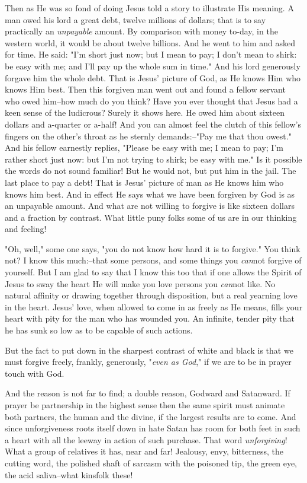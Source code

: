Then as He was so fond of doing Jesus told a story to illustrate His
meaning. A man owed his lord a great debt, twelve millions of dollars;
that is to say practically an \textit{unpayable} amount. By comparison with money
to-day, in the western world, it would be about twelve billions. And he
went to him and asked for time. He said: "I'm short just now; but I mean
to pay; I don't mean to shirk: be easy with me; and I'll pay up the whole
sum in time." And his lord generously forgave him the whole debt. That is
Jesus' picture of God, as He knows Him who knows Him best. Then this
forgiven man went out and found a fellow servant who owed him--how much do
you think? Have you ever thought that Jesus had a keen sense of the
ludicrous? Surely it shows here. He owed him about sixteen dollars and
a-quarter or a-half! And you can almost feel the clutch of this fellow's
fingers on the other's throat as he sternly demands:--"Pay me that thou
owest." And his fellow earnestly replies, "Please be easy with me; I mean
to pay; I'm rather short just now: but I'm not trying to shirk; be easy
with me." Is it possible the words do not sound familiar! But he would
not, but put him in the jail. The last place to pay a debt! That is Jesus'
picture of man as He knows him who knows him best. And in effect He says
what we have been forgiven by God is as an unpayable amount. And what are
not willing to forgive is like sixteen dollars and a fraction by contrast.
What little puny folks some of us are in our thinking and feeling!

"Oh, well," some one says, "you do not know how hard it is to forgive."
You think not? I know this much:--that some persons, and some things you
\textit{can}not forgive of yourself. But I am glad to say that I know this too
that if one allows the Spirit of Jesus to sway the heart He will make you
love persons you \textit{can}not like. No natural affinity or drawing together
through disposition, but a real yearning love in the heart. Jesus' love,
when allowed to come in as freely as He means, fills your heart with pity
for the man who has wounded you. An infinite, tender pity that he has sunk
so low as to be capable of such actions.

But the fact to put down in the sharpest contrast of white and black is
that we must forgive freely, frankly, generously, "\textit{even as God}," if we
are to be in prayer touch with God.

And the reason is not far to find; a double reason, Godward and Satanward.
If prayer be partnership in the highest sense then the same spirit must
animate both partners, the human and the divine, if the largest results
are to come. And since unforgiveness roots itself down in hate Satan has
room for both feet in such a heart with all the leeway in action of such
purchase. That word \textit{unforgiving}! What a group of relatives it has, near
and far! Jealousy, envy, bitterness, the cutting word, the polished shaft
of sarcasm with the poisoned tip, the green eye, the acid saliva--what
kinsfolk these!



